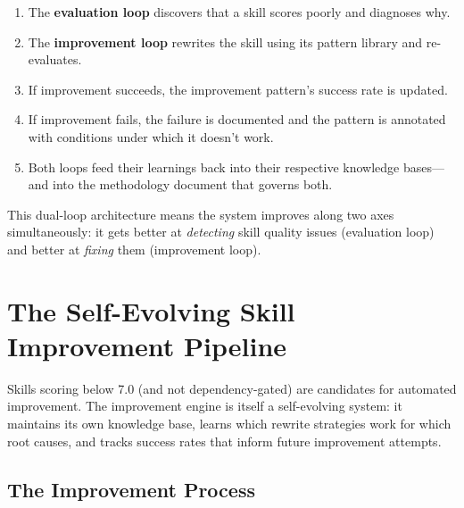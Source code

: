 \documentclass[11pt,a4paper]{article}
\begin{document}
\begin{enumerate}[leftmargin=*]
    \item The \textbf{evaluation loop} discovers that a skill scores poorly and diagnoses why.
    \item The \textbf{improvement loop} rewrites the skill using its pattern library and re-evaluates.
    \item If improvement succeeds, the improvement pattern's success rate is updated.
    \item If improvement fails, the failure is documented and the pattern is annotated with conditions under which it doesn't work.
    \item Both loops feed their learnings back into their respective knowledge bases---and into the methodology document that governs both.
\end{enumerate}

This dual-loop architecture means the system improves along two axes simultaneously: it gets better at \emph{detecting} skill quality issues (evaluation loop) and better at \emph{fixing} them (improvement loop).

\section{The Self-Evolving Skill Improvement Pipeline}
\label{sec:improve}

Skills scoring below 7.0 (and not dependency-gated) are candidates for automated improvement. The improvement engine is itself a self-evolving system: it maintains its own knowledge base, learns which rewrite strategies work for which root causes, and tracks success rates that inform future improvement attempts.

\subsection{The Improvement Process}
\end{document}
